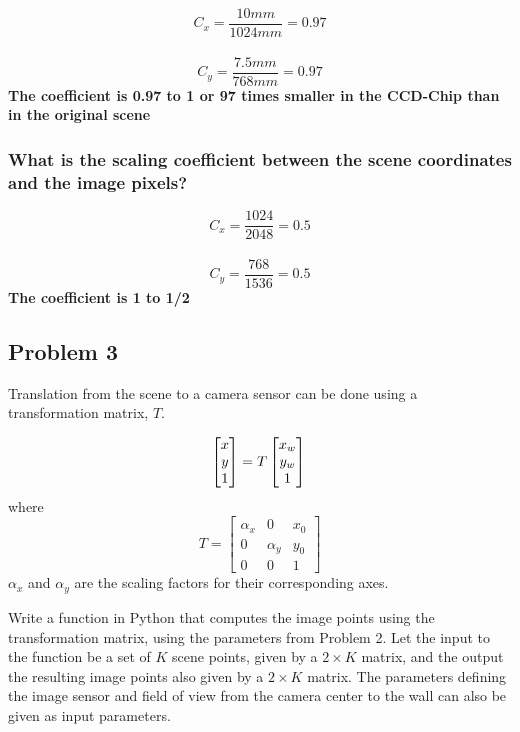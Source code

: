 \documentclass[border=1in]{standalone}
\begin{document}
\begin{minipage}{21cm}
\[C_x=\frac{10mm}{1024mm}=0.97\]\\
\[C_y=\frac{7.5mm}{768mm}=0.97\] \textbf{The coefficient is 0.97 to 1 or
97 times smaller in the CCD-Chip than in the original scene}

\hypertarget{what-is-the-scaling-coefficient-between-the-scene-coordinates-and-the-image-pixels}{%
\subsubsection{What is the scaling coefficient between the scene
coordinates and the image
pixels?}\label{what-is-the-scaling-coefficient-between-the-scene-coordinates-and-the-image-pixels}}

\[C_x=\frac{1024}{2048}=0.5\]\\
\[C_y=\frac{768}{1536}=0.5\] \textbf{The coefficient is 1 to 1/2}

    \hypertarget{problem-3}{%
\subsection{Problem 3}\label{problem-3}}

Translation from the scene to a camera sensor can be done using a
transformation matrix, \(T\).

\begin{equation}
    \begin{bmatrix} x\\y\\1\end{bmatrix} = 
    T
    \begin{bmatrix}
        x_w\\ y_w\\ 1
    \end{bmatrix}\\
\end{equation} where \begin{equation}
    T= \begin{bmatrix} \alpha_x & 0 & x_0\\
            0 & \alpha_y & y_0\\
        0   & 0 & 1
    \end{bmatrix}
\end{equation} \(\alpha_x\) and \(\alpha_y\) are the scaling factors for
their corresponding axes.

Write a function in Python that computes the image points using the
transformation matrix, using the parameters from Problem 2. Let the
input to the function be a set of \(K\) scene points, given by a
\(2 \times K\) matrix, and the output the resulting image points also
given by a \(2 \times K\) matrix. The parameters defining the image
sensor and field of view from the camera center to the wall can also be
given as input parameters.


\end{minipage}
\end{document}
